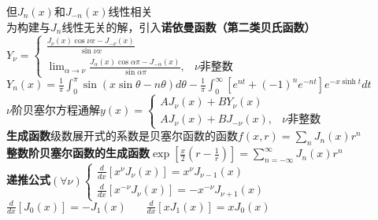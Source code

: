 \documentclass[10pt,a4paper]{article}
\begin{document}
\begin{multicols}{2}
但$J_n(x)$和$J_{-n}(x)$线性相关\\
为构建与$J_n$线性无关的解，引入\textbf{诺依曼函数（第二类贝氏函数）}\\
$Y_{\nu}=\left\{\begin{array}{ll}\frac{J_{\nu}(x)\cos\nu x-J_{-\nu}(x)}{\sin\nu x}\\\lim_{\alpha\to\nu}\frac{J_{\alpha}(x)\cos\alpha\pi-J_{-\alpha}(x)}{\sin\alpha\pi},&\nu\text{非整数}\end{array}\right.$\\
$Y_n(x)=\frac{1}{\pi}\int_0^{\pi}\sin(x\sin\theta-n\theta)d\theta-\frac{1}{\pi}\int_0^{\infty}[e^{nt}+(-1)^ne^{-nt}]e^{-x\sinh t}dt$\\
$\nu$阶贝塞尔方程通解$y(x)=\left\{\begin{array}{ll}AJ_{\nu}(x)+BY_{\nu}(x)\\AJ_{\nu}(x)+BJ_{-\nu}(x),&\nu\text{非整数}\end{array}\right.$\\
\textbf{生成函数}级数展开式的系数是贝塞尔函数的函数$f(x,r)=\sum_nJ_n(x)r^n$\\
\textbf{整数阶贝塞尔函数的生成函数}$\exp[\frac{x}{2}(r-\frac{1}{r})]=\sum_{n=-\infty}^{\infty}J_n(x)r^n$\\
\textbf{递推公式}$(\forall\nu)\left\{\begin{array}{l}\frac{d}{dx}[x^{\nu}J_{\nu}(x)]=x^{\nu}J_{\nu-1}(x)\\\frac{d}{dx}[x^{-\nu}J_{\nu}(x)]=-x^{-\nu}J_{\nu+1}(x)\end{array}\right.$\\
\indent$\frac{d}{dx}[J_0(x)]=-J_1(x)~~~~~~~~\frac{d}{dx}[xJ_1(x)]=xJ_0(x)$\\

\end{multicols}
\end{document}
